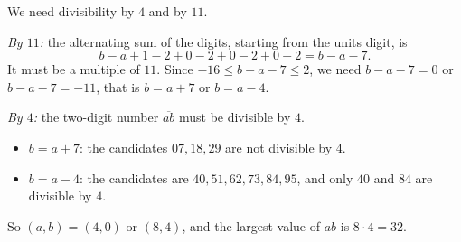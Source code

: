 We need divisibility by $4$ and by $11$.

\emph{By $11$:} the alternating sum of the digits, starting from the units digit, is
\[b-a+1-2+0-2+0-2+0-2=b-a-7.\]
It must be a multiple of $11$. Since $-16\le b-a-7\le2$, we need $b-a-7=0$ or $b-a-7=-11$, that is $b=a+7$ or $b=a-4$.

\emph{By $4$:} the two-digit number $\overline{ab}$ must be divisible by $4$.
\begin{itemize}
\item $b=a+7$: the candidates $07,18,29$ are not divisible by $4$.
\item $b=a-4$: the candidates are $40,51,62,73,84,95$, and only $40$ and $84$ are divisible by $4$.
\end{itemize}
So $(a,b)=(4,0)$ or $(8,4)$, and the largest value of $ab$ is $8\cdot4=\boxed{32}$.
